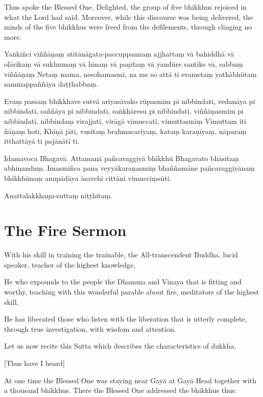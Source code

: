Thus spoke the Blessed One. Delighted, the group of five bhikkhus
rejoiced in what the Lord had said. Moreover, while this discourse was
being delivered, the minds of the five bhikkhus were freed from the
defilements, through clinging no more.

\clearpage

\paliText

Yaṅkiñci viññāṇaṃ atītānāgata-paccuppannaṃ ajjhattaṃ vā bahiddhā vā
oḷārikaṃ vā sukhumaṃ vā hīnaṃ vā paṇītaṃ vā yandūre santike vā, sabbaṃ
viññāṇaṃ Netaṃ mama, nesohamasmi, na me so attā ti evametaṃ yathābhūtaṃ
sammappaññāya daṭṭhabbaṃ.

Evaṃ passaṃ bhikkhave sutvā ariyasāvako rūpasmim pi nibbindati, vedanāya
pi nibbindati, saññāya pi nibbindati, saṅkhāresu pi nibbindati,
viññāṇasmim pi nibbindati, nibbindaṃ virajjati, virāgā vimuccati,
vimuttasmiṃ Vimuttam iti ñāṇaṃ hoti, Khīṇā jāti, vusitaṃ brahmacariyaṃ,
kataṃ karaṇīyaṃ, nāparaṃ itthattāyā ti pajānātī ti.

Idamavoca Bhagavā. Attamanā pañcavaggiyā bhikkhū Bhagavato bhāsitaṃ
abhinanduṃ. Imasmiñca pana veyyākaraṇasmiṃ bhaññamāne pañcavaggiyānaṃ
bhikkhūnaṃ anupādāya āsavehi cittāni vimucciṃsūti.

Anattalakkhaṇa-suttaṃ niṭṭhitaṃ.

\chapter{The Fire Sermon}%

\englishText

\begin{leader}

With his skill in training the trainable, the All-transcendent Buddha,
lucid speaker, teacher of the highest knowledge,

He who expounds to the people the Dhamma and Vinaya that is fitting and
worthy, teaching with this wonderful parable about fire, meditators of
the highest skill,

He has liberated those who listen with the liberation that is utterly
complete, through true investigation, with wisdom and attention.

Let us now recite this Sutta which describes the characteristics of
dukkha.

\end{leader}

[Thus have I heard]

At one time the Blessed One was staying near Gayā at Gayā Head together
with a thousand bhikkhus. There the Blessed One addressed the bhikkhus
thus:

